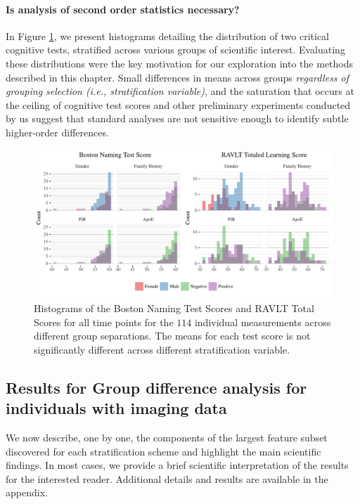 \paragraph{Is analysis of second order statistics necessary?} In Figure \ref{fig:imagehists}, we present histograms detailing the distribution of two critical cognitive tests, stratified across various groups of scientific interest. Evaluating these distributions were the key motivation for our exploration into the methods described in this chapter. Small differences in means across groups {\em regardless of grouping selection (i.e., stratification variable)}, and the saturation that occurs at the ceiling of cognitive test scores and other preliminary experiments conducted by us suggest that standard analyses are not sensitive enough to identify subtle higher-order differences.
\begin{figure}
	\centering
	\includegraphics[width=\textwidth]{3_covtraj/figs/hists.pdf}
	\caption[Summary histograms of neuropsychological test scores for preclinical AD participants]{Histograms of the Boston Naming Test Scores and RAVLT Total Scores for all time points for the $114$ individual measurements across different group separations. The means for each test score is not significantly different across different stratification variable.}
	\label{fig:imagehists}
\end{figure}
\subsection{Results for Group difference analysis for individuals with imaging data}
We now describe, one by one, the components of the largest feature subset discovered for each stratification scheme 
and highlight the main scientific findings. In most cases, we provide a brief scientific interpretation of the results
for the interested reader. 
Additional details and results are available in the appendix.
%

